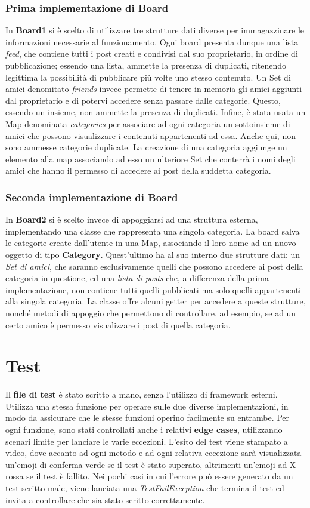 \documentclass[10pt, italian, openany]{book}
\begin{document}
\subsubsection{Prima implementazione di Board}
In \textbf{Board1} si è scelto di utilizzare tre strutture dati diverse per immagazzinare le informazioni necessarie al funzionamento.
Ogni board presenta dunque una lista \textit{feed}, che contiene tutti i post creati e condivisi dal suo proprietario, in ordine di pubblicazione; essendo una lista, ammette la presenza di duplicati, ritenendo legittima la possibilità di pubblicare più volte uno stesso contenuto. Un Set di amici denomitato \textit{friends} invece permette di tenere in memoria gli amici aggiunti dal proprietario e di potervi accedere senza passare dalle categorie. Questo, essendo un insieme, non ammette la presenza di duplicati. Infine, è stata usata un Map denominata \textit{categories} per associare ad ogni categoria un sottoinsieme di amici che possono visualizzare i contenuti appartenenti ad essa. Anche qui, non sono ammesse categorie duplicate. La creazione di una categoria aggiunge un elemento alla map associando ad esso un ulteriore Set che conterrà i nomi degli amici che hanno il permesso di accedere ai post della suddetta categoria.

\subsubsection{Seconda implementazione di Board}
In \textbf{Board2} si è scelto invece di appoggiarsi ad una struttura esterna, implementando una classe che rappresenta una singola categoria. La board salva le categorie create dall'utente in una Map, associando il loro nome ad un nuovo oggetto di tipo \textbf{Category}. Quest'ultimo ha al suo interno due strutture dati: un \textit{Set di amici}, che saranno esclusivamente quelli che possono accedere ai post della categoria in questione, ed una \textit{lista di posts} che, a differenza della prima implementazione, non contiene tutti quelli pubblicati ma solo quelli appartenenti alla singola categoria. La classe offre alcuni getter per accedere a queste strutture, nonché metodi di appoggio che permettono di controllare, ad esempio, se ad un certo amico è permesso visualizzare i post di quella categoria.

\section{Test}
Il \textbf{file di test} è stato scritto a mano, senza l'utilizzo di framework esterni. Utilizza una stessa funzione per operare sulle due diverse implementazioni, in modo da assicurare che le stesse funzioni operino facilmente su entrambe. Per ogni funzione, sono stati controllati anche i relativi \textbf{edge cases}, utilizzando scenari limite per lanciare le varie eccezioni. L'esito del test viene stampato a video, dove accanto ad ogni metodo e ad ogni relativa eccezione sarà visualizzata un'emoji di conferma verde se il test è stato superato, altrimenti un'emoji ad X rossa se il test è fallito. Nei pochi casi in cui l'errore può essere generato da un test scritto male, viene lanciata una \textit{TestFailException} che termina il test ed invita a controllare che sia stato scritto correttamente.
\end{document}
